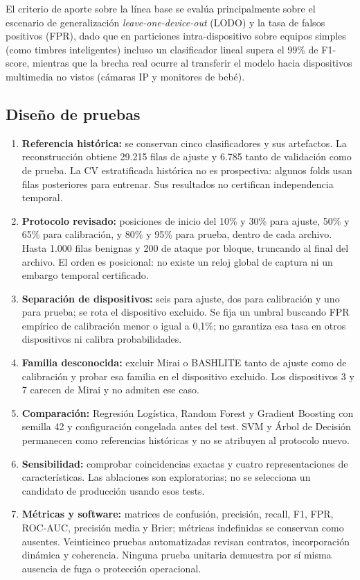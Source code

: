 \documentclass[11pt,a4paper]{article}
\begin{document}
El criterio de aporte sobre la línea base se evalúa principalmente sobre el escenario de generalización \textit{leave-one-device-out} (LODO) y la tasa de falsos positivos (FPR), dado que en particiones intra-dispositivo sobre equipos simples (como timbres inteligentes) incluso un clasificador lineal supera el 99\% de F1-score, mientras que la brecha real ocurre al transferir el modelo hacia dispositivos multimedia no vistos (cámaras IP y monitores de bebé).

\subsection{Diseño de pruebas}
\begin{enumerate}
\item \textbf{Referencia histórica:} se conservan cinco clasificadores y sus artefactos. La reconstrucción obtiene 29.215 filas de ajuste y 6.785 tanto de validación como de prueba. La CV estratificada histórica no es prospectiva: algunos folds usan filas posteriores para entrenar. Sus resultados no certifican independencia temporal.
\item \textbf{Protocolo revisado:} posiciones de inicio del 10\% y 30\% para ajuste, 50\% y 65\% para calibración, y 80\% y 95\% para prueba, dentro de cada archivo. Hasta 1.000 filas benignas y 200 de ataque por bloque, truncando al final del archivo. El orden es posicional: no existe un reloj global de captura ni un embargo temporal certificado.
\item \textbf{Separación de dispositivos:} seis para ajuste, dos para calibración y uno para prueba; se rota el dispositivo excluido. Se fija un umbral buscando FPR empírico de calibración menor o igual a 0,1\%; no garantiza esa tasa en otros dispositivos ni calibra probabilidades.
\item \textbf{Familia desconocida:} excluir Mirai o BASHLITE tanto de ajuste como de calibración y probar esa familia en el dispositivo excluido. Los dispositivos 3 y 7 carecen de Mirai y no admiten ese caso.
\item \textbf{Comparación:} Regresión Logística, Random Forest y Gradient Boosting con semilla 42 y configuración congelada antes del test. SVM y Árbol de Decisión permanecen como referencias históricas y no se atribuyen al protocolo nuevo.
\item \textbf{Sensibilidad:} comprobar coincidencias exactas y cuatro representaciones de características. Las ablaciones son exploratorias; no se selecciona un candidato de producción usando esos tests.
\item \textbf{Métricas y software:} matrices de confusión, precisión, recall, F1, FPR, ROC-AUC, precisión media y Brier; métricas indefinidas se conservan como ausentes. Veinticinco pruebas automatizadas revisan contratos, incorporación dinámica y coherencia. Ninguna prueba unitaria demuestra por sí misma ausencia de fuga o protección operacional.
\end{enumerate}
\end{document}
